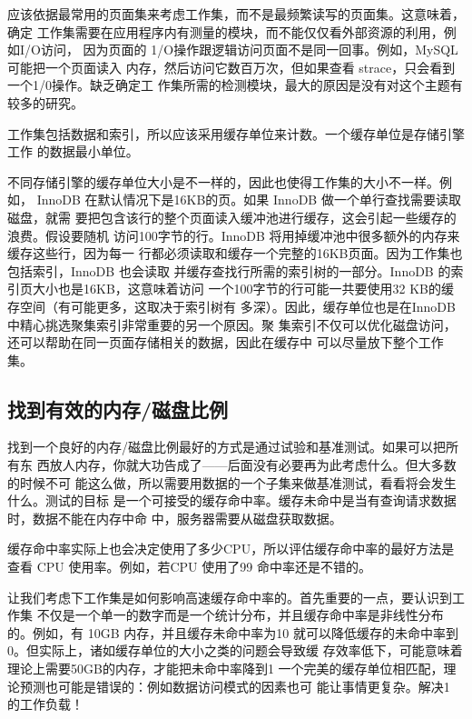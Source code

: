 应该依据最常用的页面集来考虑工作集，而不是最频繁读写的页面集。这意味着，确定
工作集需要在应用程序内有测量的模块，而不能仅仅看外部资源的利用，例如I/O访问，
因为页面的 1/O操作跟逻辑访问页面不是同一回事。例如，MySQL 可能把一个页面读入
内存，然后访问它数百万次，但如果查看 strace，只会看到一个1/0操作。缺乏确定工
作集所需的检测模块，最大的原因是没有对这个主题有较多的研究。

工作集包括数据和索引，所以应该采用缓存单位来计数。一个缓存单位是存储引擎工作
的数据最小单位。

不同存储引擎的缓存单位大小是不一样的，因此也使得工作集的大小不一样。例如，
InnoDB 在默认情况下是16KB的页。如果 InnoDB 做一个单行查找需要读取磁盘，就需
要把包含该行的整个页面读入缓冲池进行缓存，这会引起一些缓存的浪费。假设要随机
访问100字节的行。InnoDB 将用掉缓冲池中很多额外的内存来缓存这些行，因为每一
行都必须读取和缓存一个完整的16KB页面。因为工作集也包括索引，InnoDB 也会读取
并缓存查找行所需的索引树的一部分。InnoDB 的索引页大小也是16KB，这意味着访问
一个100字节的行可能一共要使用32 KB的缓存空间（有可能更多，这取决于索引树有
多深）。因此，缓存单位也是在InnoDB 中精心挑选聚集索引非常重要的另一个原因。聚
集索引不仅可以优化磁盘访问，还可以帮助在同一页面存储相关的数据，因此在缓存中
可以尽量放下整个工作集。

\subsection{找到有效的内存/磁盘比例}
找到一个良好的内存/磁盘比例最好的方式是通过试验和基准测试。如果可以把所有东
西放人内存，你就大功告成了——后面没有必要再为此考虑什么。但大多数的时候不可
能这么做，所以需要用数据的一个子集来做基准测试，看看将会发生什么。测试的目标
是一个可接受的缓存命中率。缓存未命中是当有查询请求数据时，数据不能在内存中命
中，服务器需要从磁盘获取数据。

缓存命中率实际上也会决定使用了多少CPU，所以评估缓存命中率的最好方法是查看
CPU 使用率。例如，若CPU 使用了99%
命中率还是不错的。

让我们考虑下工作集是如何影响高速缓存命中率的。首先重要的一点，要认识到工作集
不仅是一个单一的数字而是一个统计分布，并且缓存命中率是非线性分布的。例如，有
10GB 内存，并且缓存未命中率为10%
就可以降低缓存的未命中率到0。但实际上，诸如缓存单位的大小之类的问题会导致缓
存效率低下，可能意味着理论上需要50GB的内存，才能把未命中率降到1%
一个完美的缓存单位相匹配，理论预测也可能是错误的：例如数据访问模式的因素也可
能让事情更复杂。解决1%
的工作负载！

